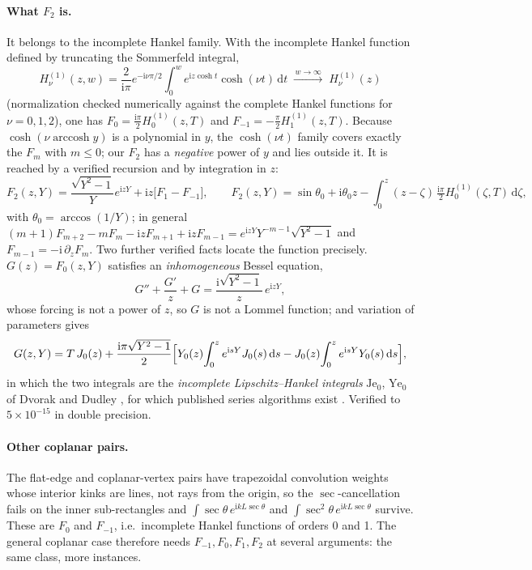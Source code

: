 \documentclass[11pt]{article}
\theoremstyle{remark}
\newcommand{\dd}{\mathrm{d}}
\newcommand{\ii}{\mathrm{i}}
\begin{document}
\paragraph{What $F_2$ is.} It belongs to the incomplete Hankel family. With the
incomplete Hankel function defined by truncating the Sommerfeld integral,
\begin{equation}
H^{(1)}_\nu(z, w) = \frac{2}{\ii\pi}e^{-\ii\nu\pi/2}\int_0^w e^{\ii z\cosh t}\cosh(\nu t)\,\dd t
\;\xrightarrow{\,w\to\infty\,}\; H^{(1)}_\nu(z)
\end{equation}
(normalization checked numerically against the complete Hankel functions for
$\nu = 0,1,2$), one has $F_0 = \tfrac{\ii\pi}{2}H^{(1)}_0(z,T)$ and
$F_{-1} = -\tfrac{\pi}{2}H^{(1)}_1(z,T)$. Because $\cosh(\nu\operatorname{arccosh}y)$
is a polynomial in $y$, the $\cosh(\nu t)$ family covers exactly the $F_m$ with
$m\le 0$; our $F_2$ has a \emph{negative} power of $y$ and lies outside it. It is
reached by a verified recursion and by integration in $z$:
\begin{equation}
F_2(z,Y) = \frac{\sqrt{Y^2-1}}{Y}e^{\ii zY} + \ii z\bigl[F_1 - F_{-1}\bigr],\qquad
F_2(z,Y) = \sin\theta_0 + \ii\theta_0 z - \int_0^z (z-\zeta)\,\tfrac{\ii\pi}{2}H^{(1)}_0(\zeta,T)\,\dd\zeta,
\end{equation}
with $\theta_0 = \arccos(1/Y)$; in general $(m+1)F_{m+2} - mF_m - \ii zF_{m+1} + \ii zF_{m-1}
= e^{\ii zY}Y^{-m-1}\sqrt{Y^2-1}$ and $F_{m-1} = -\ii\,\partial_z F_m$. Two further
verified facts locate the function precisely. $G(z) = F_0(z,Y)$ satisfies an
\emph{inhomogeneous} Bessel equation,
\begin{equation}
G'' + \frac{G'}{z} + G = \frac{\ii\sqrt{Y^2-1}}{z}\,e^{\ii zY},
\end{equation}
whose forcing is not a power of $z$, so $G$ is not a Lommel function; and variation of
parameters gives
\begin{equation}
G(z,Y) = T\,J_0(z) + \frac{\ii\pi\sqrt{Y^2-1}}{2}\Bigl[Y_0(z)\!\int_0^z e^{\ii sY}J_0(s)\,\dd s - J_0(z)\!\int_0^z e^{\ii sY}Y_0(s)\,\dd s\Bigr],
\end{equation}
in which the two integrals are the \emph{incomplete Lipschitz--Hankel integrals}
$\mathrm{Je}_0$, $\mathrm{Ye}_0$ of Dvorak and Dudley \cite{dvorak}, for which
published series algorithms exist \cite{zhu}. Verified to $5\times10^{-15}$ in
double precision.

\paragraph{Other coplanar pairs.} The flat-edge and coplanar-vertex pairs have
trapezoidal convolution weights whose interior kinks are lines, not rays from the
origin, so the $\sec$-cancellation fails on the inner sub-rectangles and
$\int\sec\theta\,e^{\ii kL\sec\theta}$ and $\int\sec^2\theta\,e^{\ii kL\sec\theta}$
survive. These are $F_0$ and $F_{-1}$, i.e.\ incomplete Hankel functions of orders 0
and 1. The general coplanar case therefore needs $F_{-1}, F_0, F_1, F_2$ at several
arguments: the same class, more instances.
\end{document}
